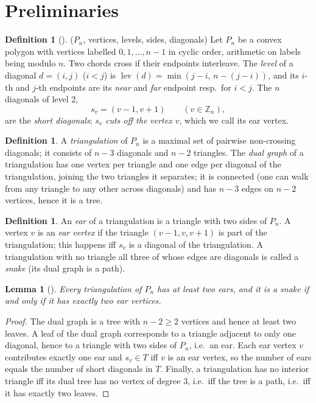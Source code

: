 \documentclass[11pt,a4paper]{article}
\newtheorem{lemma}[theorem]{Lemma}
\theoremstyle{definition}
\newtheorem{definition}[theorem]{Definition}
\theoremstyle{remark}
\newcommand{\Zd}{\ensuremath{\mathbb{Z}}}
\begin{document}
\section{Preliminaries}

\begin{definition}[\label{def:poly}]
($P_n$, vertices, levels, sides, diagonals)
Let $P_n$ be a convex polygon with vertices labelled $0,1,\dots,n-1$ in cyclic order,
arithmetic on labels being modulo $n$.  Two chords cross if their endpoints interleave.
The \emph{level} of a diagonal $d=(i,j)$ ($i<j$) is
$\operatorname{lev}(d)=\min(j-i,\,n-(j-i))$, and its $i$-th and $j$-th endpoints are its
\emph{near} and \emph{far} endpoint resp.\ for $i<j$.  The $n$ diagonals of level $2$,
\[
  s_v=(v-1,v+1)\qquad (v\in\Zd_n),
\]
are the \emph{short diagonals}; $s_v$ \emph{cuts off the vertex $v$}, which we call its ear
vertex.
\end{definition}

\begin{definition}
A \emph{triangulation} of $P_n$ is a maximal set of pairwise non-crossing diagonals; it
consists of $n-3$ diagonals and $n-2$ triangles.  The \emph{dual graph} of a triangulation
has one vertex per triangle and one edge per diagonal of the triangulation, joining the two
triangles it separates; it is connected (one can walk from any triangle to any other across
diagonals) and has $n-3$ edges on $n-2$ vertices, hence it is a tree.
\end{definition}

\begin{definition}
An \emph{ear} of a triangulation is a triangle with two sides of $P_n$.  A vertex $v$ is
an \emph{ear vertex} if the triangle $(v-1,v,v+1)$ is part of the triangulation; this
happens iff $s_v$ is a diagonal of the triangulation.  A triangulation with no triangle all
three of whose edges are diagonals is called a \emph{snake} (its dual graph is a path).
\end{definition}

\begin{lemma}[\label{lem:ears}]
Every triangulation of $P_n$ has at least two ears, and it is a snake if and only if it has
exactly two ear vertices.
\end{lemma}

\begin{proof}
The dual graph is a tree with $n-2\ge2$ vertices and hence at least two leaves.  A leaf of
the dual graph corresponds to a triangle adjacent to only one diagonal, hence to a triangle
with two sides of $P_n$, i.e.\ an ear.  Each ear vertex $v$ contributes exactly one ear and
$s_v\in T$ iff $v$ is an ear vertex, so the number of ears equals the number of short
diagonals in $T$.  Finally, a triangulation has no interior triangle iff its dual tree has
no vertex of degree $3$, i.e.\ iff the tree is a path, i.e.\ iff it has exactly two leaves.
\end{proof}
\end{document}

